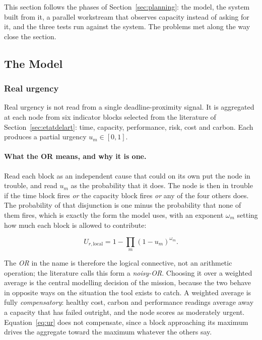 
This section follows the phases of Section~\ref{sec:planning}: the model, the system built
from it, a parallel workstream that observes capacity instead of asking for it, and the three
tests run against the system. The problems met along the way close the section.

\subsection{The Model}
\label{sec:realisation_modele}

\subsubsection{Real urgency}

Real urgency is not read from a single deadline-proximity signal. It is aggregated at each
node from six indicator blocks selected from the literature of
Section~\ref{sec:etatdelart}: time, capacity, performance, risk, cost and carbon. Each
produces a partial urgency $u_m \in [0,1]$.

\paragraph{What the OR means, and why it is one.}
Read each block as an independent cause that could on its own put the node in trouble, and
read $u_m$ as the probability that it does. The node is then in trouble if the time block
fires \emph{or} the capacity block fires \emph{or} any of the four others does. The
probability of that disjunction is one minus the probability that none of them fires, which
is exactly the form the model uses, with an exponent $\omega_m$ setting how much each block is
allowed to contribute:

\begin{equation}
    U_{r,\text{local}} = 1 - \prod_{m} (1 - u_m)^{\omega_m}.
    \label{eq:ur}
\end{equation}

The \emph{OR} in the name is therefore the logical connective, not an arithmetic operation;
the literature calls this form a \emph{noisy-OR}. Choosing it over a weighted average is the
central modelling decision of the mission, because the two behave in opposite ways on the
situation the tool exists to catch. A weighted average is fully \emph{compensatory}: healthy
cost, carbon and performance readings average away a capacity that has failed outright, and
the node scores as moderately urgent. Equation~\ref{eq:ur} does not compensate, since a block
approaching its maximum drives the aggregate toward the maximum whatever the others say.


